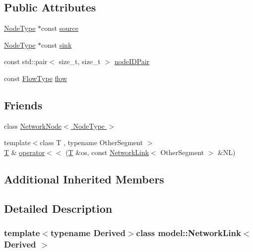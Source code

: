 \subsection*{Public Attributes}
\begin{DoxyCompactItemize}
\item 
\hyperlink{_network_typedefs_8h_a723f680c66f6a92647827790bcbafce0}{Node\+Type} $\ast$const \hyperlink{classmodel_1_1_network_link_abd4d47e500d0fafe994f2663ce571faf}{source}
\item 
\hyperlink{_network_typedefs_8h_a723f680c66f6a92647827790bcbafce0}{Node\+Type} $\ast$const \hyperlink{classmodel_1_1_network_link_ab30d55b16fb714b9ea6c8d30a6d5a1c6}{sink}
\item 
const std\+::pair$<$ size\+\_\+t, size\+\_\+t $>$ \hyperlink{classmodel_1_1_network_link_a2eed0e5b229d53fd9f69b33df5187275}{node\+I\+D\+Pair}
\item 
const \hyperlink{_spline_segment_base__common_8h_aec2b17f3c09c54f93636cbedceffde56}{Flow\+Type} \hyperlink{classmodel_1_1_network_link_a8c4ac993a9be36610bfac925143bc032}{flow}
\end{DoxyCompactItemize}
\subsection*{Friends}
\begin{DoxyCompactItemize}
\item 
class \hyperlink{classmodel_1_1_network_link_a7abf7cf19735a05b8e12bd8f57d2bc70}{Network\+Node$<$ Node\+Type $>$}
\item 
{\footnotesize template$<$class T , typename Other\+Segment $>$ }\\\hyperlink{_spline_node_base__corder1_8h_a82692d3a5502b91460591f1d5504314a}{T} \& \hyperlink{classmodel_1_1_network_link_a697470482b401379bdd240715d2681cf}{operator$<$$<$} (\hyperlink{_spline_node_base__corder1_8h_a82692d3a5502b91460591f1d5504314a}{T} \&os, const \hyperlink{classmodel_1_1_network_link}{Network\+Link}$<$ Other\+Segment $>$ \&N\+L)
\end{DoxyCompactItemize}
\subsection*{Additional Inherited Members}


\subsection{Detailed Description}
\subsubsection*{template$<$typename Derived$>$class model\+::\+Network\+Link$<$ Derived $>$}



